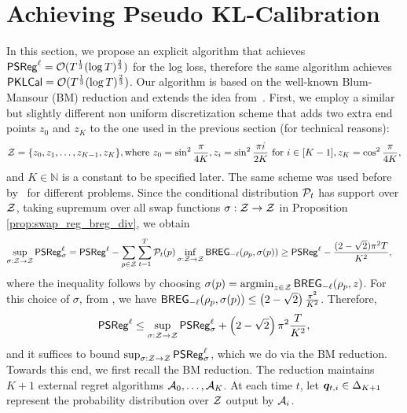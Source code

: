 \section{Achieving Pseudo KL-Calibration}\label{sec:pseudo-KL-Cal}
In this section, we propose an explicit algorithm that achieves $\mathsf{PSReg}^{\ell} = \mathcal{O}(T^{\frac{1}{3}} (\log T) ^ {\frac{2}{3}})$ for the log loss, therefore the same algorithm achieves $\mathsf{PKLCal} = \mathcal{O}(T^{\frac{1}{3}} (\log T) ^ {\frac{2}{3}})$. Our algorithm is based on the well-known Blum-Mansour (BM) reduction \citep{blum2007external} and extends the idea from~\citet{fishelsonfull}. 
First, we employ a similar but slightly different non uniform discretization scheme that adds two extra end points $z_0$ and $z_{K}$ to the one used in the previous section (for technical reasons):
\begin{align*}
    \mathcal{Z} = \{z_{0}, z_{1}, \dots, z_{K - 1}, z_{K}\}, \text{where } z_{0} = \sin^{2} \frac{\pi}{4K}, z_{i} = \sin ^ {2} \frac{\pi i}{2K} \text{ for } i \in [K - 1], z_{K} = \cos^{2}\frac{\pi}{4K},
\end{align*}
and $K \in \mathbb{N}$ is a constant to be specified later. 
The same scheme was used before by~\citet{rooij2009learning, kotlowski2016online} for different problems.
Since the conditional distribution $\mathcal{P}_{t}$ has support over $\mathcal{Z}$, taking supremum over all swap functions $\sigma: \mathcal{Z} \to \mathcal{Z}$ in Proposition \ref{prop:swap_reg_breg_div}, we obtain \begin{align*}
    \sup_{\sigma: \mathcal{Z} \to \mathcal{Z}}  \mathsf{PSReg}_{\sigma} ^ {\ell} &= \mathsf{PSReg}^{{\ell}} -  \sum_{p \in \mathcal{Z}} {\sum_{t = 1} ^ {T} \mathcal{P}_{t}(p)} \inf_{\sigma: \mathcal{Z} \to \mathcal{Z}}\mathsf{BREG}_{-\ell}(\rho_{p}, \sigma(p)) \ge \mathsf{PSReg}^{{\ell}} -  \frac{(2 - \sqrt{2}) \pi ^ {2} T}{K ^ {2}},
\end{align*}
where the inequality follows by choosing $\sigma(p) = \operatorname*{argmin}_{z \in \mathcal{Z}} \mathsf{BREG}_{-\ell}(\rho_p, z)$. For this choice of $\sigma$, from \citep[page 13]{kotlowski2016online}, we have $\mathsf{BREG}_{-\ell}(\rho_p, \sigma(p)) \le \left( 2 - \sqrt{2} \right) \frac{\pi ^ {2}}{K ^ {2}}$. Therefore, \begin{align}\label{eq:psreg_[0,1]_to_psreg_Z}
     \mathsf{PSReg}^{{\ell}} \le  \sup_{\sigma: \mathcal{Z} \to \mathcal{Z}}  \mathsf{PSReg}_{\sigma} ^ {\ell} + \left( 2 - \sqrt{2} \right) \pi ^ {2} \frac{T}{K ^ {2}},
\end{align}
and it suffices to bound $\sup_{\sigma: \mathcal{Z} \to \mathcal{Z}}  \mathsf{PSReg}_{\sigma} ^ {\ell}$, which we do via the BM reduction. Towards this end, we first recall the BM reduction. The reduction maintains $K + 1$ external regret algorithms $\mathcal{A}_{0}, \dots, \mathcal{A}_{K}$. At each time $t$, let ${\bm{q}}_{t, i} \in \Delta_{K + 1}$ represent the probability distribution over $\mathcal{Z}$ output by $\mathcal{A}_{i}$.
